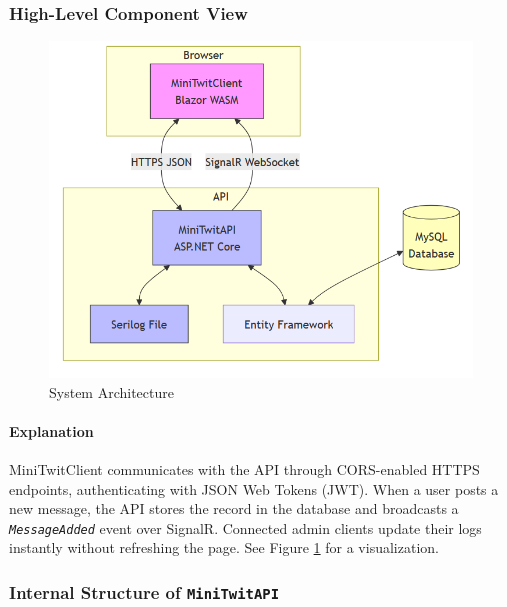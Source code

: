 \subsubsection{High-Level Component View}

\begin{figure}[H]
    \centering
    \includegraphics[width=1\linewidth]{images/Architecture.png}
    \caption{System Architecture}
    \label{fig:architecture}
\end{figure}

\paragraph{Explanation} MiniTwitClient communicates with the API through CORS-enabled HTTPS endpoints, authenticating with JSON Web Tokens (JWT). When a user posts a new message, the API stores the record in the database and broadcasts a \emph{\lstinline{MessageAdded}} event over SignalR. Connected
admin clients update their logs instantly without refreshing the page. See Figure \ref{fig:architecture} for a visualization.

\subsubsection{Internal Structure of \texttt{MiniTwitAPI}}

